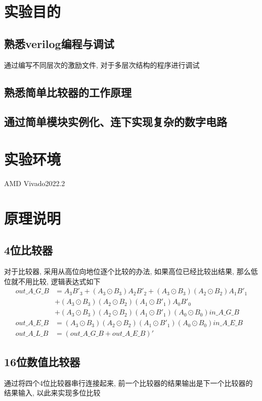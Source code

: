 \documentclass[fontset=windows,12pt]{article}
\begin{document}
\section{实验目的}
    \subsection{熟悉verilog编程与调试}
    通过编写不同层次的激励文件, 对于多层次结构的程序进行调试
    \subsection{熟悉简单比较器的工作原理}
    \subsection{通过简单模块实例化、连下实现复杂的数字电路}

\section{实验环境}
    AMD Vivado2022.2

\section{原理说明}
    \subsection{4位比较器}
        对于比较器, 采用从高位向地位逐个比较的办法, 如果高位已经比较出结果, 那么低位就不用比较, 逻辑表达式如下
        \begin{align*}
            out\_A\_G\_B &= A_3B'_3+(A_3\odot B_3)A_2B'_2+(A_3\odot B_3)(A_2\odot B_2)A_1B'_1\\
                    &+(A_3\odot B_3)(A_2\odot B_2)(A_1\odot B'_1)A_0B'_0\\
                    &+(A_3\odot B_3)(A_2\odot B_2)(A_1\odot B'_1)(A_0\odot B_0)in\_A\_G\_B\\
            out\_A\_E\_B &=(A_3\odot B_3)(A_2\odot B_2)(A_1\odot B'_1)(A_0\odot B_0)in\_A\_E\_B\\
            out\_A\_L\_B &=(out\_A\_G\_B+out\_A\_E\_B)'
        \end{align*}
    \subsection{16位数值比较器}
        通过将四个4位比较器串行连接起来, 前一个比较器的结果输出是下一个比较器的结果输入, 以此来实现多位比较
\end{document}
